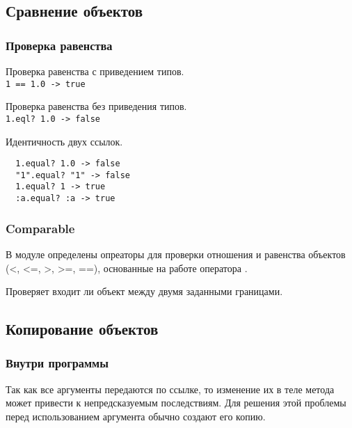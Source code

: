 \subsection{Сравнение объектов}

\subsubsection*{Проверка равенства}

\begin{methodlist}
  \alias{===} 
  Проверка равенства с приведением типов. 
  \\\verb!1 == 1.0 -> true!

  Проверка равенства без приведения типов. 
  \\\verb!1.eql? 1.0 -> false!
 
  Идентичность двух ссылок.
  \begin{verbatim}
  1.equal? 1.0 -> false 
  "1".equal? "1" -> false 
  1.equal? 1 -> true 
  :a.equal? :a -> true
  \end{verbatim}
\end{methodlist}

\subsubsection*{Comparable}

В модуле определены опреаторы для проверки отношения и равенства объектов (<, <=, >, >=, ==), основанные на работе оператора \method{<=>}.

\begin{methodlist}
  Проверяет входит ли объект между двумя заданными границами.
\end{methodlist}

\subsection{Копирование объектов}

\subsubsection*{Внутри программы}

Так как все аргументы передаются по ссылке, то изменение их в теле метода может привести к непредсказуемым последствиям. Для решения этой проблемы перед использованием аргумента обычно создают его копию.

